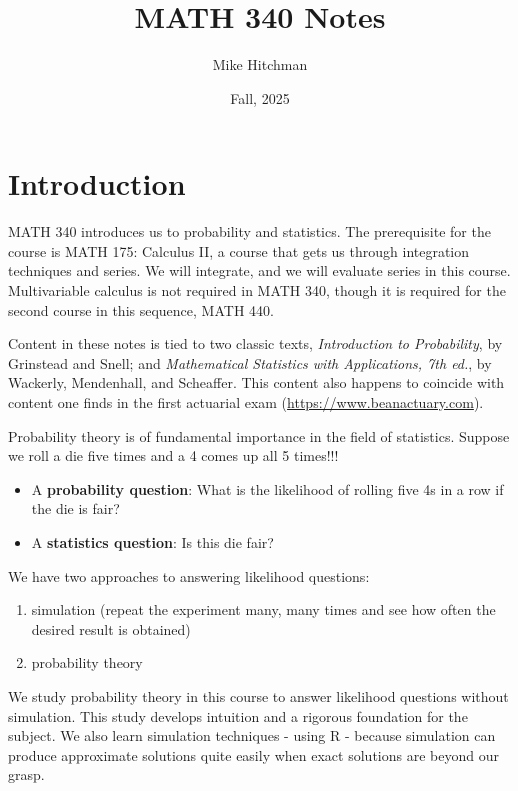 \documentclass[
]{book}
\title{MATH 340 Notes}
\author{Mike Hitchman}
\date{Fall, 2025}
\providecommand{\tightlist}{%
  \setlength{\itemsep}{0pt}\setlength{\parskip}{0pt}}
\theoremstyle{definition}
\theoremstyle{definition}
\theoremstyle{definition}
\theoremstyle{definition}
\theoremstyle{remark}
\begin{document}
\maketitle

{
\setcounter{tocdepth}{1}
\tableofcontents
}
\chapter{Introduction}\label{introduction}

MATH 340 introduces us to probability and statistics. The prerequisite for the course is MATH 175: Calculus II, a course that gets us through integration techniques and series. We will integrate, and we will evaluate series in this course. Multivariable calculus is not required in MATH 340, though it is required for the second course in this sequence, MATH 440.

Content in these notes is tied to two classic texts, \emph{Introduction to Probability}, by Grinstead and Snell; and \emph{Mathematical Statistics with Applications, 7th ed.}, by Wackerly, Mendenhall, and Scheaffer. This content also happens to coincide with content one finds in the first actuarial exam (\url{https://www.beanactuary.com}).

Probability theory is of fundamental importance in the field of statistics. Suppose we roll a die five times and a 4 comes up all 5 times!!!

\begin{itemize}
\tightlist
\item
  A \textbf{probability question}: What is the likelihood of rolling five 4s in a row if the die is fair?
\item
  A \textbf{statistics question}: Is this die fair?
\end{itemize}

We have two approaches to answering likelihood questions:

\begin{enumerate}
\def\labelenumi{\arabic{enumi}.}
\tightlist
\item
  simulation (repeat the experiment many, many times and see how often the desired result is obtained)
\item
  probability theory
\end{enumerate}

We study probability theory in this course to answer likelihood questions without simulation. This study develops intuition and a rigorous foundation for the subject. We also learn simulation techniques - using R - because simulation can produce approximate solutions quite easily when exact solutions are beyond our grasp.
\end{document}
